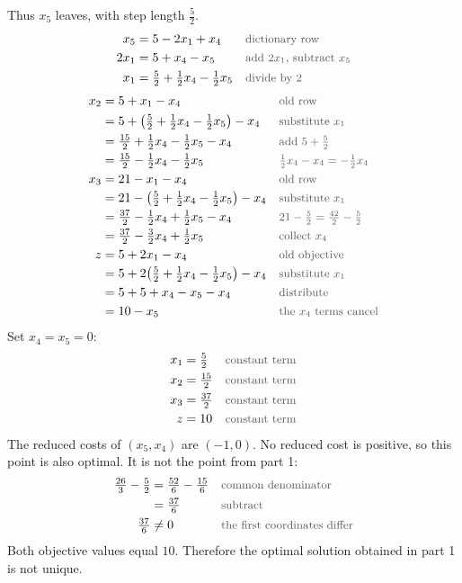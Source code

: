 \documentclass[a4paper,11pt]{article}
\newcommand{\why}[1]{\text{\small\color{black!65}#1}}
\begin{document}
Thus $x_5$ leaves, with step length $\tfrac52$.
\begin{align*}
x_5&=5-2x_1+x_4&&\why{dictionary row}\\
2x_1&=5+x_4-x_5&&\why{add $2x_1$, subtract $x_5$}\\
x_1&=\tfrac52+\tfrac12 x_4-\tfrac12 x_5&&\why{divide by $2$}
\end{align*}
\begin{align*}
x_2&=5+x_1-x_4&&\why{old row}\\
&=5+\bigl(\tfrac52+\tfrac12 x_4-\tfrac12 x_5\bigr)-x_4&&\why{substitute $x_1$}\\
&=\tfrac{15}{2}+\tfrac12 x_4-\tfrac12 x_5-x_4&&\why{add $5+\tfrac52$}\\
&=\tfrac{15}{2}-\tfrac12 x_4-\tfrac12 x_5&&\why{$\tfrac12 x_4-x_4=-\tfrac12 x_4$}\\
x_3&=21-x_1-x_4&&\why{old row}\\
&=21-\bigl(\tfrac52+\tfrac12 x_4-\tfrac12 x_5\bigr)-x_4&&\why{substitute $x_1$}\\
&=\tfrac{37}{2}-\tfrac12 x_4+\tfrac12 x_5-x_4&&\why{$21-\tfrac52=\tfrac{42}{2}-\tfrac{5}{2}$}\\
&=\tfrac{37}{2}-\tfrac32 x_4+\tfrac12 x_5&&\why{collect $x_4$}\\
z&=5+2x_1-x_4&&\why{old objective}\\
&=5+2\bigl(\tfrac52+\tfrac12 x_4-\tfrac12 x_5\bigr)-x_4&&\why{substitute $x_1$}\\
&=5+5+x_4-x_5-x_4&&\why{distribute}\\
&=10-x_5&&\why{the $x_4$ terms cancel}
\end{align*}
Set $x_4=x_5=0$:
\begin{align*}
x_1&=\tfrac52&&\why{constant term}\\
x_2&=\tfrac{15}{2}&&\why{constant term}\\
x_3&=\tfrac{37}{2}&&\why{constant term}\\
z&=10&&\why{constant term}
\end{align*}
The reduced costs of $(x_5,x_4)$ are $(-1,0)$. No reduced cost is positive, so this point is also optimal. It is not the point from part 1:
\begin{align*}
\tfrac{26}{3}-\tfrac52&=\tfrac{52}{6}-\tfrac{15}{6}&&\why{common denominator}\\
&=\tfrac{37}{6}&&\why{subtract}\\
\tfrac{37}{6}&\neq 0&&\why{the first coordinates differ}
\end{align*}
Both objective values equal $10$. Therefore the optimal solution obtained in part 1 is not unique.
\end{document}
